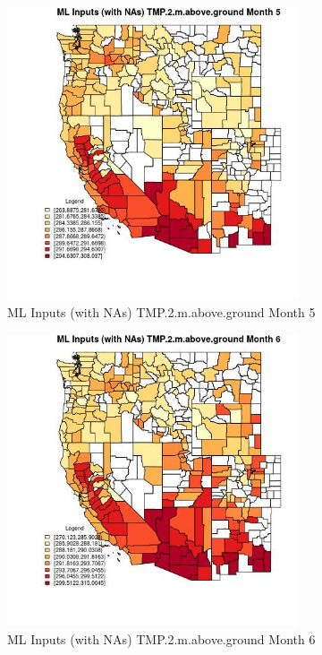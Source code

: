 \begin{figure} 
\centering  
\includegraphics[width=0.77\textwidth]{Code_Outputs/Report_ML_input_PM25_Step4_part_e_de_duplicated_aves_compiled_2019-05-21wNAs_CountyTMP2mabovegroundmedianMonth5.jpg} 
\caption{\label{fig:Report_ML_input_PM25_Step4_part_e_de_duplicated_aves_compiled_2019-05-21wNAsCountyTMP2mabovegroundmedianMonth5}ML Inputs (with NAs) TMP.2.m.above.ground Month 5} 
\end{figure} 
 

\begin{figure} 
\centering  
\includegraphics[width=0.77\textwidth]{Code_Outputs/Report_ML_input_PM25_Step4_part_e_de_duplicated_aves_compiled_2019-05-21wNAs_CountyTMP2mabovegroundmedianMonth6.jpg} 
\caption{\label{fig:Report_ML_input_PM25_Step4_part_e_de_duplicated_aves_compiled_2019-05-21wNAsCountyTMP2mabovegroundmedianMonth6}ML Inputs (with NAs) TMP.2.m.above.ground Month 6} 
\end{figure} 
 

